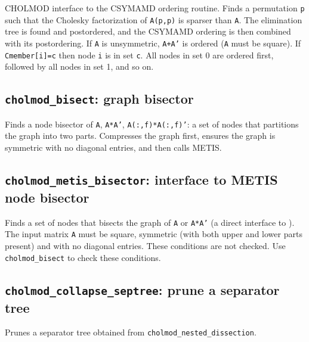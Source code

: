 \documentclass[11pt]{article}
\begin{document}

CHOLMOD interface to the CSYMAMD ordering routine.  Finds a permutation {\tt p}
such that the Cholesky factorization of {\tt A(p,p)} is sparser than {\tt A}.
The elimination tree is found and postordered, and the CSYMAMD ordering is then
combined with its postordering.  If {\tt A} is unsymmetric, {\tt A+A'} is
ordered ({\tt A} must be square).  If {\tt Cmember[i]=c} then node {\tt i} is
in set {\tt c}.  All nodes in set 0 are ordered first, followed by all nodes in
set 1, and so on.

\subsection{{\tt cholmod\_bisect}: graph bisector}


Finds a node bisector of {\tt A}, {\tt A*A'}, {\tt A(:,f)*A(:,f)'}: a set of
nodes that partitions the graph into two parts.  Compresses the graph first,
ensures the graph is symmetric with no diagonal entries, and then calls METIS.

\subsection{{\tt cholmod\_metis\_bisector}: interface to METIS node bisector}


Finds a set of nodes that bisects the graph of {\tt A} or {\tt A*A'} (a direct
interface to ).  The input matrix
{\tt A} must be square, symmetric (with both upper and lower parts present) and
with no diagonal entries.  These conditions are not checked.  Use
{\tt cholmod\_bisect} to check these conditions.

\subsection{{\tt cholmod\_collapse\_septree}: prune a separator tree}


Prunes a separator tree obtained from {\tt cholmod\_nested\_dissection}.

\newpage


\end{document}

